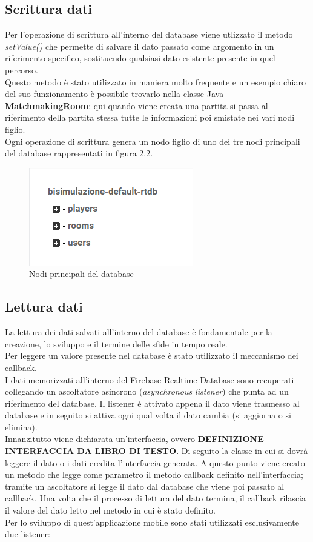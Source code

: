 \documentclass[a4paper,12pt,twoside,openright]{report}
\begin{document}
\subsection{Scrittura dati}
Per l'operazione di scrittura all'interno del database viene utlizzato il metodo \textit{setValue()} che permette di salvare il dato passato come argomento in un riferimento specifico, sostituendo qualsiasi dato esistente presente in quel percorso.\\
Questo metodo è stato utilizzato in maniera molto frequente e un esempio chiaro del suo funzionamento è possibile trovarlo nella classe Java \textbf{MatchmakingRoom}: qui quando viene creata una partita si passa al riferimento della partita stessa tutte le informazioni poi smistate nei vari nodi figlio.\\
Ogni operazione di scrittura genera un nodo figlio di uno dei tre nodi principali del database rappresentati in figura 2.2.
\begin{figure}[h]
\includegraphics{images/Main nodes.png}
\caption{Nodi principali del database}
\end{figure}

\subsection{Lettura dati}
La lettura dei dati salvati all'interno del database è fondamentale per la creazione, lo sviluppo e il termine delle sfide in tempo reale.\\
Per leggere un valore presente nel database è stato utilizzato il meccanismo dei callback.\\
I dati memorizzati all'interno del Firebase Realtime Database sono recuperati collegando un ascoltatore asincrono (\textit{asynchronous listener}) che punta ad un riferimento del database. Il listener è attivato appena il dato viene trasmesso al database e in seguito si attiva ogni qual volta il dato cambia (si aggiorna o si elimina).\\
Innanzitutto viene dichiarata un'interfaccia, ovvero \textbf{DEFINIZIONE INTERFACCIA DA LIBRO DI TESTO}.
Di seguito la classe in cui si dovrà leggere il dato o i dati eredita l'interfaccia generata. A questo punto viene creato un metodo che legge come parametro il metodo callback definito nell'interfaccia; tramite un ascoltatore si legge il dato dal database che viene poi passato al callback. Una volta che il processo di lettura del dato termina, il callback rilascia il valore del dato letto nel metodo in cui è stato definito.\\
Per lo sviluppo di quest'applicazione mobile sono stati utilizzati esclusivamente due listener:
\end{document}
